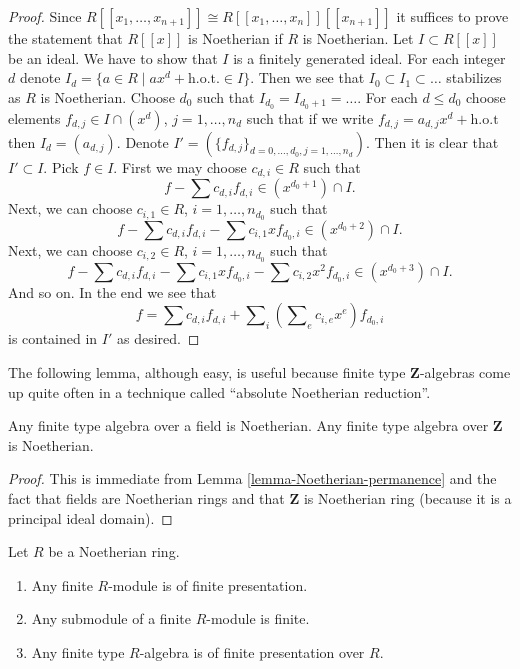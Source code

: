 \begin{proof}
Since $R[[x_1, \ldots, x_{n + 1}]] \cong R[[x_1, \ldots, x_n]][[x_{n + 1}]]$
it suffices to prove the statement that $R[[x]]$ is Noetherian if
$R$ is Noetherian. Let $I \subset R[[x]]$ be an ideal.
We have to show that $I$ is a finitely generated ideal.
For each integer
$d$ denote $I_d = \{a \in R \mid ax^d + \text{h.o.t.} \in I\}$.
Then we see that $I_0 \subset I_1 \subset \ldots$ stabilizes as $R$
is Noetherian. Choose $d_0$ such that $I_{d_0} = I_{d_0 + 1} = \ldots$.
For each $d \leq d_0$ choose elements $f_{d, j} \in I \cap (x^d)$,
$j = 1, \ldots, n_d$ such that if we write
$f_{d, j} = a_{d, j}x^d + \text{h.o.t}$ then $I_d = (a_{d, j})$.
Denote $I' = (\{f_{d, j}\}_{d = 0, \ldots, d_0, j = 1, \ldots, n_d})$.
Then it is clear that $I' \subset I$. Pick $f \in I$.
First we may choose $c_{d, i} \in R$ such that
$$
f - \sum c_{d, i} f_{d, i} \in (x^{d_0 + 1}) \cap I.
$$
Next, we can choose $c_{i, 1} \in R$, $i = 1, \ldots, n_{d_0}$ such that
$$
f - \sum c_{d, i} f_{d, i} - \sum c_{i, 1}xf_{d_0, i} \in (x^{d_0 + 2}) \cap I.
$$
Next, we can choose $c_{i, 2} \in R$, $i = 1, \ldots, n_{d_0}$ such that
$$
f - \sum c_{d, i} f_{d, i} - \sum c_{i, 1}xf_{d_0, i}
- \sum c_{i, 2}x^2f_{d_0, i}
\in (x^{d_0 + 3}) \cap I.
$$
And so on. In the end we see that
$$
f = \sum c_{d, i} f_{d, i} +
\sum\nolimits_i (\sum\nolimits_e c_{i, e} x^e)f_{d_0, i}
$$
is contained in $I'$ as desired.
\end{proof}

\noindent
The following lemma, although easy, is useful because
finite type $\mathbf{Z}$-algebras come up quite often in
a technique called ``absolute Noetherian reduction''.

\begin{lemma}
\label{lemma-obvious-Noetherian}
Any finite type algebra over a field is Noetherian.
Any finite type algebra over $\mathbf{Z}$ is Noetherian.
\end{lemma}

\begin{proof}
This is immediate from Lemma \ref{lemma-Noetherian-permanence}
and the fact that fields are Noetherian rings and that
$\mathbf{Z}$ is Noetherian ring (because it is a
principal ideal domain).
\end{proof}

\begin{lemma}
\label{lemma-Noetherian-finite-type-is-finite-presentation}
Let $R$ be a Noetherian ring.
\begin{enumerate}
\item Any finite $R$-module is of finite presentation.
\item Any submodule of a finite $R$-module is finite.
\item Any finite type $R$-algebra is of finite presentation over $R$.
\end{enumerate}
\end{lemma}

